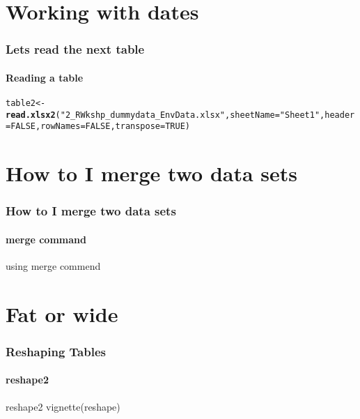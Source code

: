 \documentclass[12pt]{beamer}\usepackage[]{graphicx}\usepackage[]{color}
\makeatletter
\newcommand{\hlnum}[1]{\textcolor[rgb]{0.686,0.059,0.569}{#1}}%
\newcommand{\hlstr}[1]{\textcolor[rgb]{0.192,0.494,0.8}{#1}}%
\newcommand{\hlstd}[1]{\textcolor[rgb]{0.345,0.345,0.345}{#1}}%
\newcommand{\hlkwb}[1]{\textcolor[rgb]{0.69,0.353,0.396}{#1}}%
\newcommand{\hlkwc}[1]{\textcolor[rgb]{0.333,0.667,0.333}{#1}}%
\newcommand{\hlkwd}[1]{\textcolor[rgb]{0.737,0.353,0.396}{\textbf{#1}}}%
\newenvironment{kframe}{%
 \def\at@end@of@kframe{}%
 \ifinner\ifhmode%
  \def\at@end@of@kframe{\end{minipage}}%
  \begin{minipage}{\columnwidth}%
 \fi\fi%
 \def\FrameCommand##1{\hskip\@totalleftmargin \hskip-\fboxsep
 \colorbox{shadecolor}{##1}\hskip-\fboxsep
     \hskip-\linewidth \hskip-\@totalleftmargin \hskip\columnwidth}%
 \MakeFramed {\advance\hsize-\width
   \@totalleftmargin\z@ \linewidth\hsize
   \@setminipage}}%
 {\par\unskip\endMakeFramed%
 \at@end@of@kframe}
\newenvironment{knitrout}{}{} %
\makeatother
\begin{document}
\section*{Working with dates}
\begin{frame}
  \frametitle{Lets read the next table}
  \framesubtitle{Reading a table}
\begin{knitrout}
\color{fgcolor}\begin{kframe}
\begin{alltt}
\hlstd{table2}\hlkwb{<-}\hlkwd{read.xlsx2}\hlstd{(}\hlstr{"2_R Wkshp_dummy data_Env Data.xlsx"}\hlstd{,} \hlkwc{sheetName} \hlstd{=} \hlstr{"Sheet1"}\hlstd{,}\hlkwc{header}\hlstd{=}\hlnum{FALSE}\hlstd{,}\hlkwc{rowNames}\hlstd{=}\hlnum{FALSE}\hlstd{,}\hlkwc{transpose}\hlstd{=}\hlnum{TRUE}\hlstd{)}
\end{alltt}


{\ttfamily\noindent\bfseries{}}\end{kframe}
\end{knitrout}
\begin{kframe}


{\ttfamily\noindent\bfseries\color{errorcolor}{\#\# Error in head(table2[, 1:5]): error in evaluating the argument 'x' in selecting a method for function 'head': Error: object 'table2' not found}}\end{kframe}
\clearpage
\end{frame}


\section*{How to I merge two data sets}
\begin{frame}
  \frametitle{How to I merge two data sets}
  \framesubtitle{merge command}
  using merge commend
\end{frame}  

\section*{Fat or wide}
\begin{frame}
  \frametitle{Reshaping Tables}
  \framesubtitle{reshape2}
  \begin{block}{reshape2}
  vignette(reshape)
  \end{block}
\end{frame}  
\end{document}
